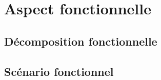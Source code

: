 \section{Aspect fonctionnelle}
	
	\subsection{Décomposition fonctionnelle}
	

	
	\subsection{Scénario fonctionnel}

   
    